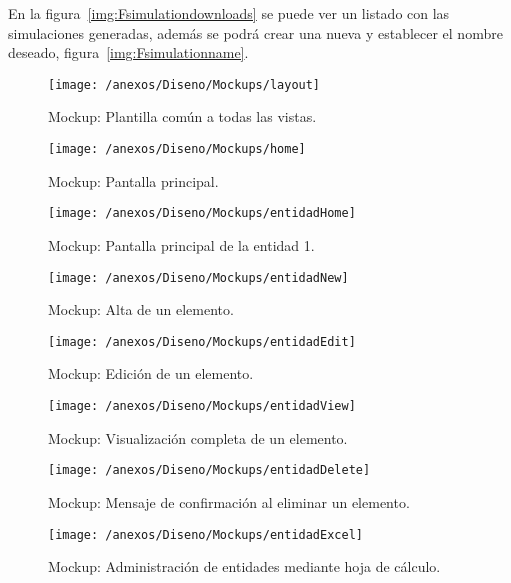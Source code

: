 En la figura~\ref{img:Fsimulationdownloads} se puede ver un listado con las simulaciones generadas, además se podrá crear una nueva y establecer el nombre deseado, figura~\ref{img:Fsimulationname}.


\begin{figure}[h]
	\centering
	\texttt{[image: /anexos/Diseno/Mockups/layout]}
	\caption{Mockup: Plantilla común a todas las vistas.}
	\label{img:layout}
\end{figure}

\begin{figure}[h]
	\centering
	\texttt{[image: /anexos/Diseno/Mockups/home]}
	\caption{Mockup: Pantalla principal.}
	\label{img:home}
\end{figure}

\begin{figure}[h]
	\centering
	\texttt{[image: /anexos/Diseno/Mockups/entidadHome]}
	\caption{Mockup: Pantalla principal de la entidad 1.}
	\label{img:entidadHome}
\end{figure}

\begin{figure}[h]
	\centering
	\texttt{[image: /anexos/Diseno/Mockups/entidadNew]}
	\caption{Mockup: Alta de un elemento.}
	\label{img:entidadNew}
\end{figure}

\begin{figure}[h]
	\centering
	\texttt{[image: /anexos/Diseno/Mockups/entidadEdit]}
	\caption{Mockup: Edición de un elemento.}
	\label{img:entidadEdit}
\end{figure}

\begin{figure}[h]
	\centering
	\texttt{[image: /anexos/Diseno/Mockups/entidadView]}
	\caption{Mockup: Visualización completa de un elemento.}
	\label{img:entidadView}
\end{figure}

\begin{figure}[h]
	\centering
	\texttt{[image: /anexos/Diseno/Mockups/entidadDelete]}
	\caption{Mockup: Mensaje de confirmación al eliminar un elemento.}
	\label{img:entidadDelete}
\end{figure}

\begin{figure}[h]
	\centering
	\texttt{[image: /anexos/Diseno/Mockups/entidadExcel]}
	\caption{Mockup: Administración de entidades mediante hoja de cálculo.}
	\label{img:entidadExcel}
\end{figure}

